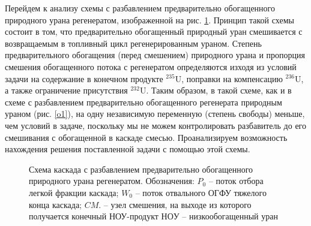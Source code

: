 Перейдем к анализу схемы с разбавлением предварительно обогащенного природного урана регенератом, изображенной на рис. \ref{o2}. Принцип такой схемы состоит в том, что предварительно обогащенный природный уран смешивается с возвращаемым в топливный цикл регенерированным ураном. Степень предварительного обогащения (перед смешением) природного урана и пропорция смешения обогащенного потока с регенератом определяются изходя из условий задачи на содержание в конечном продукте $^{235}$U, поправки на компенсацию $^{236}$U, а также ограничение присутствия $^{232}$U. Таким образом, в такой схеме, как и в схеме с разбавлением предварительно обогащенного регенерата природным ураном (рис. \ref{o1}), на одну независимую переменную (степень свободы) меньше, чем условий в задаче, поскольку мы не можем контролировать разбавитель до его смешивания с обогащенной в каскаде смесью. Проанализируем возможность нахождения решения поставленной задачи с помощью этой схемы.


\begin{figure}[ht]
  \caption{Схема каскада с разбавлением предварительно обогащенного природного урана регенератом. Обозначения: $P_0$ -- поток отбора легкой фракции каскада; $W_0$ -- поток отвального ОГФУ тяжелого конца каскада; $CM.$ -- узел смешения, на выходе из которого получается конечный НОУ-продукт $НОУ$  -- низкообогащенный уран}\label{o2}
\end{figure}


